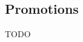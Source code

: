 \documentclass[FIPLY_base.tex]{subfiles}
\author{Daniel Bersenkowitsch}
\date{25. Februar 2016}
\begin{document}
\subsection{Promotions}
TODO
\end{document}
